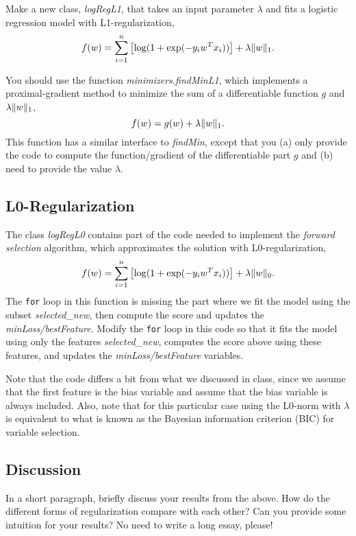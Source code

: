 \documentclass{article}
\begin{document}
Make a new class, \emph{logRegL1}, that takes an input parameter $\lambda$ and fits a logistic regression model with L1-regularization,
\[
f(w) = \sum_{i=1}^n \left[\log(1+\exp(-y_iw^Tx_i))\right] + \lambda\|w\|_1.
\]


You should use the function \emph{minimizers.findMinL1}, which implements a 
proximal-gradient method to minimize the sum of a differentiable function $g$ and $\lambda\|w\|_1$,
\[
f(w) = g(w) + \lambda \|w\|_1.
\]
This function has a similar interface to \emph{findMin}, except that you (a) 
only provide the code to compute the function/gradient of the differentiable 
part $g$ and (b) need to provide the value $\lambda$. 


\subsection{L0-Regularization}

The class \emph{logRegL0} contains part of the code needed to implement the \emph{forward selection} algorithm, 
which approximates the solution with L0-regularization,
\[
f(w) =  \sum_{i=1}^n \left[\log(1+\exp(-y_iw^Tx_i))\right] + \lambda\|w\|_0.
\]
The \texttt{for} loop in this function is missing the part where we fit the model using the subset \emph{selected\_new}, 
then compute the score and updates the \emph{minLoss/bestFeature}. 
Modify the \texttt{for} loop in this code so that it fits the model using only 
the features \emph{selected\_new}, computes the score above using these features, 
and updates the \emph{minLoss/bestFeature} variables.

Note that the code differs a bit from what we discussed in class, 
since we assume that the first feature is the bias variable and assume that the 
bias variable is always included. Also, note that for this particular case using 
the L0-norm with $\lambda$ is equivalent to what is known as the Bayesian 
information criterion (BIC) for variable selection.


\subsection{Discussion}

In a short paragraph, briefly discuss your results from the above. How do the 
different forms of regularization compare with each other? 
Can you provide some intuition for your results? No need to write a long essay, please! 
\end{document}
